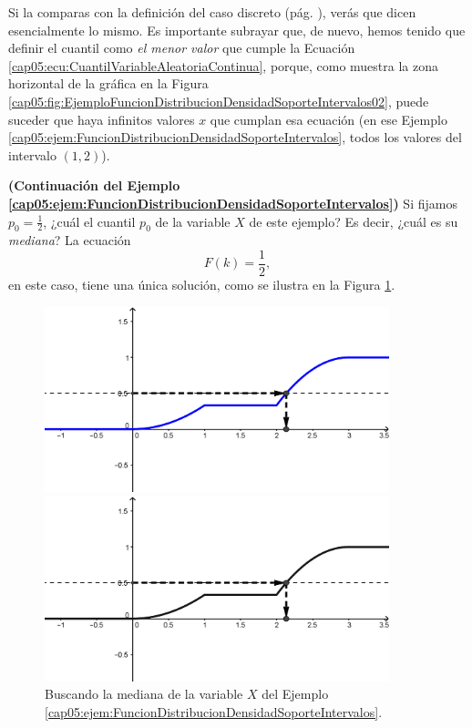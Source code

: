 Si la comparas con la definición del caso discreto (pág. \pageref{cap04:ecu:CuantilVariableAleatoriaDiscreta}), verás que dicen esencialmente lo mismo. Es importante subrayar que, de nuevo, hemos tenido que definir el cuantil como {\em el menor valor} que  cumple la Ecuación \ref{cap05:ecu:CuantilVariableAleatoriaContinua}, porque, como muestra la zona horizontal de la gráfica en la Figura \ref{cap05:fig:EjemploFuncionDistribucionDensidadSoporteIntervalos02}, puede suceder que haya infinitos valores $x$ que cumplan esa ecuación (en ese Ejemplo \ref{cap05:ejem:FuncionDistribucionDensidadSoporteIntervalos}, todos los valores del intervalo $(1,2)$).

\begin{ejemplo}{\bf (Continuación del Ejemplo \ref{cap05:ejem:FuncionDistribucionDensidadSoporteIntervalos})}
\label{cap05:ejem:FuncionDistribucionDensidadSoporteIntervalos02}
Si fijamos $p_0=\frac{1}{2}$, ¿cuál el cuantil $p_0$ de la variable $X$ de este ejemplo? Es decir, ¿cuál es su {\em mediana}? La ecuación
\[F(k)=\dfrac{1}{2},\]
en este caso, tiene una única solución, como se ilustra en la Figura \ref{cap05:fig:EjemploFuncionDistribucionDensidadSoporteIntervalos03}.

\begin{figure}[h]
\begin{center}
\begin{enColor}
\includegraphics[width=10cm]{../fig/Cap05-EjemploFuncionDistribucionDensidadSoporteIntervalos03.png}
\end{enColor}
\begin{bn}
\includegraphics[width=10cm]{../fig/Cap05-EjemploFuncionDistribucionDensidadSoporteIntervalos03-bn.png}
\end{bn}
\caption{Buscando la mediana de la variable $X$ del Ejemplo \ref{cap05:ejem:FuncionDistribucionDensidadSoporteIntervalos}.}
\label{cap05:fig:EjemploFuncionDistribucionDensidadSoporteIntervalos03}
\end{center}
\end{figure}


\end{ejemplo}
